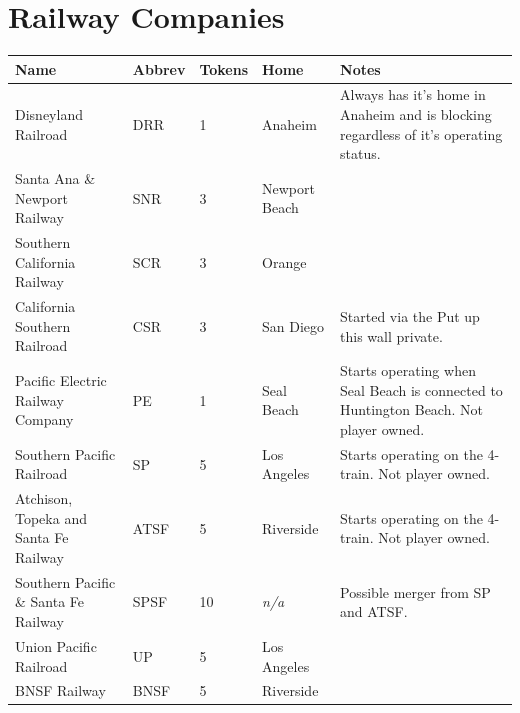 \documentclass[letterpaper]{article}
\begin{document}
\section{Railway Companies}
\begin{tabularx}{\linewidth}{X|l|l|l|X}
  \hline
  \textbf{Name} & \textbf{Abbrev} & \textbf{Tokens} & \textbf{Home} & \textbf{Notes} \\
  \hline
  \hline
  Disneyland Railroad & DRR & 1 & Anaheim & Always has it's home in Anaheim and is blocking regardless of it's operating status. \\
  \hline
  Santa Ana \& Newport Railway & SNR & 3 & Newport Beach & \\
  \hline
  Southern California Railway & SCR & 3 & Orange & \\
  \hline
  California Southern Railroad & CSR & 3 & San Diego & Started via the Put up this wall private. \\
  \hline
  Pacific Electric Railway Company & PE & 1 & Seal Beach & Starts operating when Seal Beach is connected to Huntington Beach. Not player owned. \\
  \hline
  Southern Pacific Railroad & SP & 5 & Los Angeles & Starts operating on the 4-train. Not player owned. \\
  \hline
  Atchison, Topeka and Santa Fe Railway & ATSF & 5 & Riverside & Starts operating on the 4-train. Not player owned. \\
  \hline
  Southern Pacific \& Santa Fe Railway & SPSF & 10 & \textit{n/a} & Possible merger from SP and ATSF. \\
  \hline
  Union Pacific Railroad & UP & 5 & Los Angeles & \\
  \hline
  BNSF Railway & BNSF & 5 & Riverside & \\
  \hline
\end{tabularx}

\newpage
\end{document}
